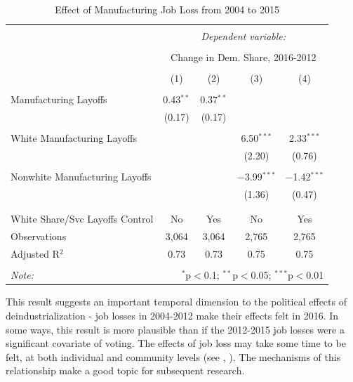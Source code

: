\documentclass[]{AEA}
\begin{document}
\begin{table}[!htbp] \centering 
  \caption{Effect of Manufacturing Job Loss from 2004 to 2015} 
  \label{regResult12} 
\begin{tabular}{@{\extracolsep{5pt}}lcccc} 
\\[-1.8ex]\hline 
\hline \\[-1.8ex] 
 & \multicolumn{4}{c}{\textit{Dependent variable:}} \\ 
\cline{2-5} 
\\[-1.8ex] & \multicolumn{4}{c}{Change in Dem. Share, 2016-2012} \\ 
\\[-1.8ex] & (1) & (2) & (3) & (4)\\ 
\hline \\[-1.8ex] 
 Manufacturing Layoffs & 0.43$^{**}$ & 0.37$^{**}$ &  &  \\ 
  & (0.17) & (0.17) &  &  \\ 
  & & & & \\ 
 White Manufacturing Layoffs &  &  & 6.50$^{***}$ & 2.33$^{***}$ \\ 
  &  &  & (2.20) & (0.76) \\ 
  & & & & \\ 
 Nonwhite Manufacturing Layoffs &  &  & $-$3.99$^{***}$ & $-$1.42$^{***}$ \\ 
  &  &  & (1.36) & (0.47) \\ 
  & & & & \\ 
\hline \\[-1.8ex] 
White Share/Svc Layoffs Control & No & Yes & No & Yes \\ 
Observations & 3,064 & 3,064 & 2,765 & 2,765 \\ 
Adjusted R$^{2}$ & 0.73 & 0.73 & 0.75 & 0.75 \\ 
\hline 
\hline \\[-1.8ex] 
\textit{Note:}  & \multicolumn{4}{r}{$^{*}$p$<$0.1; $^{**}$p$<$0.05; $^{***}$p$<$0.01} \\ 
\end{tabular} 
\end{table}

This result suggests an important temporal dimension to the political
effects of deindustrialization - job losses in 2004-2012 make their
effects felt in 2016. In some ways, this result is more plausible than
if the 2012-2015 job losses were a significant covariate of voting. The
effects of job loss may take some time to be felt, at both individual
and community levels (see \cite{Mckee09}, \cite{Foote19}). The
mechanisms of this relationship make a good topic for subsequent
research.
\end{document}
